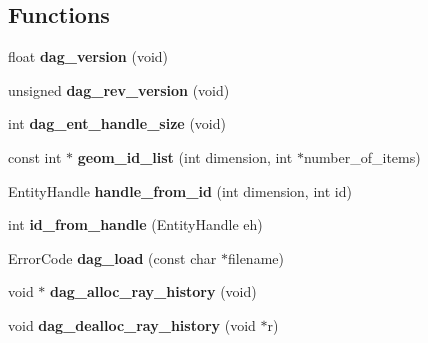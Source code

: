 \subsection*{Functions}
\begin{DoxyCompactItemize}
\item 
\hypertarget{namespacepyne_a2213248fb59d53de02ff3317321f35a1}{float {\bfseries dag\-\_\-version} (void)}\label{namespacepyne_a2213248fb59d53de02ff3317321f35a1}

\item 
\hypertarget{namespacepyne_a3a4f252b82e4290ee8c9e82a8db38da6}{unsigned {\bfseries dag\-\_\-rev\-\_\-version} (void)}\label{namespacepyne_a3a4f252b82e4290ee8c9e82a8db38da6}

\item 
\hypertarget{namespacepyne_a258aedf1cd43d592c20dc7527db14fc1}{int {\bfseries dag\-\_\-ent\-\_\-handle\-\_\-size} (void)}\label{namespacepyne_a258aedf1cd43d592c20dc7527db14fc1}

\item 
\hypertarget{namespacepyne_a947c94bdefb6541c33439817b5293ef9}{const int $\ast$ {\bfseries geom\-\_\-id\-\_\-list} (int dimension, int $\ast$number\-\_\-of\-\_\-items)}\label{namespacepyne_a947c94bdefb6541c33439817b5293ef9}

\item 
\hypertarget{namespacepyne_a793858138da0f88a32c4b03401bef215}{Entity\-Handle {\bfseries handle\-\_\-from\-\_\-id} (int dimension, int id)}\label{namespacepyne_a793858138da0f88a32c4b03401bef215}

\item 
\hypertarget{namespacepyne_ac13399f54545bd88502c3cb7e2fae4c3}{int {\bfseries id\-\_\-from\-\_\-handle} (Entity\-Handle eh)}\label{namespacepyne_ac13399f54545bd88502c3cb7e2fae4c3}

\item 
\hypertarget{namespacepyne_ae29cb4ffcd3fea6fbb2b6418cdb0b42d}{Error\-Code {\bfseries dag\-\_\-load} (const char $\ast$filename)}\label{namespacepyne_ae29cb4ffcd3fea6fbb2b6418cdb0b42d}

\item 
\hypertarget{namespacepyne_afa68eb50ccf4aa327937219dd3c05e02}{void $\ast$ {\bfseries dag\-\_\-alloc\-\_\-ray\-\_\-history} (void)}\label{namespacepyne_afa68eb50ccf4aa327937219dd3c05e02}

\item 
\hypertarget{namespacepyne_a9243f772bbf6b63bac405c28328dd253}{void {\bfseries dag\-\_\-dealloc\-\_\-ray\-\_\-history} (void $\ast$r)}\label{namespacepyne_a9243f772bbf6b63bac405c28328dd253}


\end{DoxyCompactItemize}

